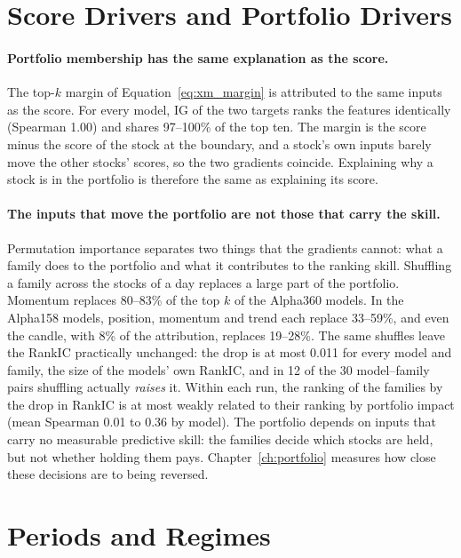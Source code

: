 \section{Score Drivers and Portfolio Drivers}
\label{sec:res_portfolio}

\paragraph{Portfolio membership has the same explanation as the score.} The top-$k$ margin of Equation~\ref{eq:xm_margin} is attributed to the same inputs as the score. For every model, IG of the two targets ranks the features identically (Spearman 1.00) and shares 97--100\% of the top ten. The margin is the score minus the score of the stock at the boundary, and a stock's own inputs barely move the other stocks' scores, so the two gradients coincide. Explaining why a stock is in the portfolio is therefore the same as explaining its score.

\paragraph{The inputs that move the portfolio are not those that carry the skill.} Permutation importance separates two things that the gradients cannot: what a family does to the portfolio and what it contributes to the ranking skill. Shuffling a family across the stocks of a day replaces a large part of the portfolio. Momentum replaces 80--83\% of the top $k$ of the Alpha360 models. In the Alpha158 models, position, momentum and trend each replace 33--59\%, and even the candle, with 8\% of the attribution, replaces 19--28\%. The same shuffles leave the RankIC practically unchanged: the drop is at most 0.011 for every model and family, the size of the models' own RankIC, and in 12 of the 30 model--family pairs shuffling actually \emph{raises} it. Within each run, the ranking of the families by the drop in RankIC is at most weakly related to their ranking by portfolio impact (mean Spearman 0.01 to 0.36 by model). The portfolio depends on inputs that carry no measurable predictive skill: the families decide which stocks are held, but not whether holding them pays. Chapter~\ref{ch:portfolio} measures how close these decisions are to being reversed.

\section{Periods and Regimes}
\label{sec:res_periods}

